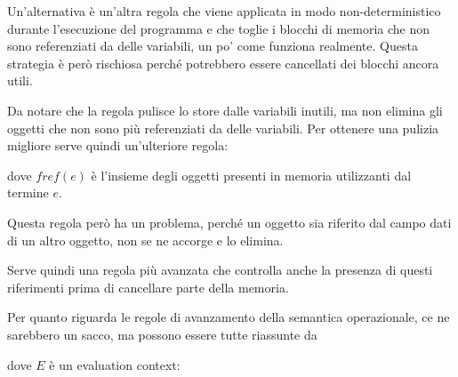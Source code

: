 \begin{prooftree}
\end{prooftree}

\noindent Un'alternativa è un'altra regola che viene applicata in modo non-deterministico durante l'esecuzione del programma e che toglie i blocchi di memoria che non sono referenziati da delle variabili, un po' come funziona realmente. Questa strategia è però rischiosa perché potrebbero essere cancellati dei blocchi ancora utili.

Da notare che la regola  pulisce lo store dalle variabili inutili, ma non elimina gli oggetti che non sono più referenziati da delle variabili. Per ottenere una pulizia migliore serve quindi un'ulteriore regola:

\begin{prooftree}
\end{prooftree}

\noindent dove $fref(e)$ è l'insieme degli oggetti presenti in memoria utilizzanti dal termine $e$. 

Questa regola però ha un problema, perché un oggetto sia riferito dal campo dati di un altro oggetto, non se ne accorge e lo elimina.

Serve quindi una regola più avanzata che controlla anche la presenza di questi riferimenti prima di cancellare parte della memoria.

\begin{prooftree}
\end{prooftree}

\noindent Per quanto riguarda le regole di avanzamento della semantica operazionale, ce ne sarebbero un sacco, ma possono essere tutte riassunte da

\begin{prooftree}
\end{prooftree}

\noindent dove $E$ è un evaluation context:

